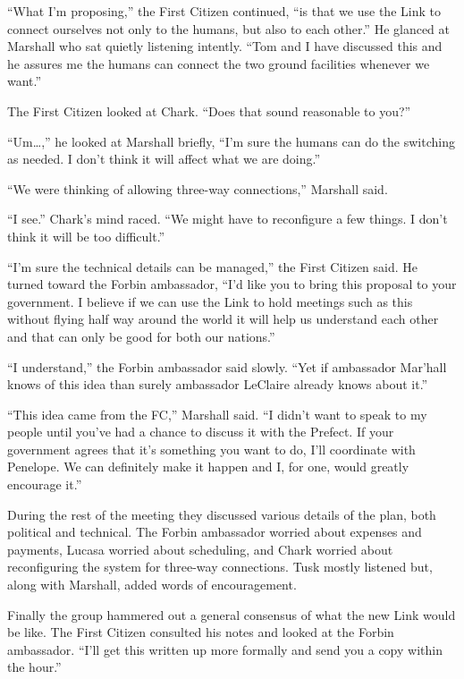 
``What I'm proposing,'' the First Citizen continued, ``is that we use the Link to connect
ourselves not only to the humans, but also to each other.'' He glanced at Marshall who sat
quietly listening intently. ``Tom and I have discussed this and he assures me the humans can
connect the two ground facilities whenever we want.''

The First Citizen looked at Chark. ``Does that sound reasonable to you?''

``Um\ldots,'' he looked at Marshall briefly, ``I'm sure the humans can do the switching as
needed. I don't think it will affect what we are doing.''

``We were thinking of allowing three-way connections,'' Marshall said.

``I see.'' Chark's mind raced. ``We might have to reconfigure a few things. I don't think it
will be too difficult.''

``I'm sure the technical details can be managed,'' the First Citizen said. He turned toward the
Forbin ambassador, ``I'd like you to bring this proposal to your government. I believe if we can
use the Link to hold meetings such as this without flying half way around the world it will help
us understand each other and that can only be good for both our nations.''

``I understand,'' the Forbin ambassador said slowly. ``Yet if ambassador Mar'hall knows of this
idea than surely ambassador LeClaire already knows about it.''

``This idea came from the FC,'' Marshall said. ``I didn't want to speak to my people until
you've had a chance to discuss it with the Prefect. If your government agrees that it's
something you want to do, I'll coordinate with Penelope. We can definitely make it happen and I,
for one, would greatly encourage it.''

During the rest of the meeting they discussed various details of the plan, both political and
technical. The Forbin ambassador worried about expenses and payments, Lucasa worried about
scheduling, and Chark worried about reconfiguring the system for three-way connections. Tusk
mostly listened but, along with Marshall, added words of encouragement.

Finally the group hammered out a general consensus of what the new Link would be like. The First
Citizen consulted his notes and looked at the Forbin ambassador. ``I'll get this written up more
formally and send you a copy within the hour.''


